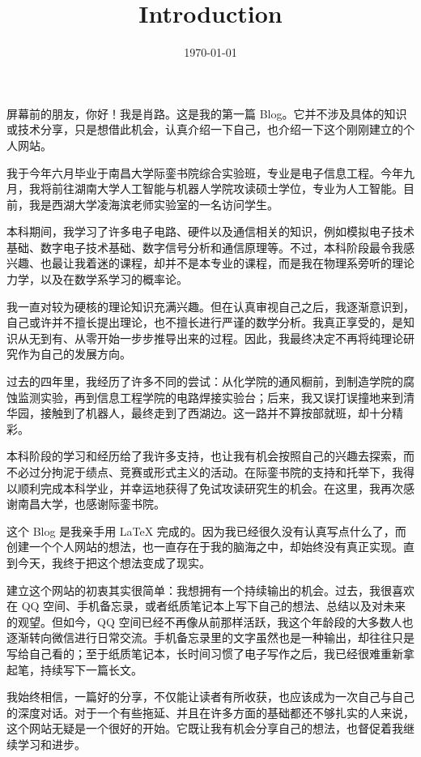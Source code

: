 \documentclass[UTF8,12pt,a4paper]{ctexart}
\title{\textbf{Introduction}}
\date{\today}
\begin{document}
	
	\pagestyle{plain}
	
	\maketitle
	
	
	屏幕前的朋友，你好！我是肖路。这是我的第一篇 Blog。它并不涉及具体的知识或技术分享，只是想借此机会，认真介绍一下自己，也介绍一下这个刚刚建立的个人网站。
	
	我于今年六月毕业于南昌大学际銮书院综合实验班，专业是电子信息工程。今年九月，我将前往湖南大学人工智能与机器人学院攻读硕士学位，专业为人工智能。目前，我是西湖大学凌海滨老师实验室的一名访问学生。
	
	本科期间，我学习了许多电子电路、硬件以及通信相关的知识，例如模拟电子技术基础、数字电子技术基础、数字信号分析和通信原理等。不过，本科阶段最令我感兴趣、也最让我着迷的课程，却并不是本专业的课程，而是我在物理系旁听的理论力学，以及在数学系学习的概率论。
	
	我一直对较为硬核的理论知识充满兴趣。但在认真审视自己之后，我逐渐意识到，自己或许并不擅长提出理论，也不擅长进行严谨的数学分析。我真正享受的，是知识从无到有、从零开始一步步推导出来的过程。因此，我最终决定不再将纯理论研究作为自己的发展方向。
	
	过去的四年里，我经历了许多不同的尝试：从化学院的通风橱前，到制造学院的腐蚀监测实验，再到信息工程学院的电路焊接实验台；后来，我又误打误撞地来到清华园，接触到了机器人，最终走到了西湖边。这一路并不算按部就班，却十分精彩。
	
	本科阶段的学习和经历给了我许多支持，也让我有机会按照自己的兴趣去探索，而不必过分拘泥于绩点、竞赛或形式主义的活动。在际銮书院的支持和托举下，我得以顺利完成本科学业，并幸运地获得了免试攻读研究生的机会。在这里，我再次感谢南昌大学，也感谢际銮书院。
	
	这个 Blog 是我亲手用 \LaTeX{} 完成的。因为我已经很久没有认真写点什么了，而创建一个个人网站的想法，也一直存在于我的脑海之中，却始终没有真正实现。直到今天，我终于把这个想法变成了现实。
	
	建立这个网站的初衷其实很简单：我想拥有一个持续输出的机会。过去，我很喜欢在 QQ 空间、手机备忘录，或者纸质笔记本上写下自己的想法、总结以及对未来的观望。但如今，QQ 空间已经不再像从前那样活跃，我这个年龄段的大多数人也逐渐转向微信进行日常交流。手机备忘录里的文字虽然也是一种输出，却往往只是写给自己看的；至于纸质笔记本，长时间习惯了电子写作之后，我已经很难重新拿起笔，持续写下一篇长文。
	
	我始终相信，一篇好的分享，不仅能让读者有所收获，也应该成为一次自己与自己的深度对话。对于一个有些拖延、并且在许多方面的基础都还不够扎实的人来说，这个网站无疑是一个很好的开始。它既让我有机会分享自己的想法，也督促着我继续学习和进步。
	
\end{document}
